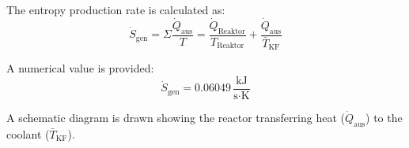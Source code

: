 The entropy production rate is calculated as:  
\[
\dot{S}_{\text{gen}} = \Sigma \frac{\dot{Q}_{\text{aus}}}{T} = \frac{\dot{Q}_{\text{Reaktor}}}{T_{\text{Reaktor}}} + \frac{\dot{Q}_{\text{aus}}}{\bar{T}_{\text{KF}}}
\]  

A numerical value is provided:  
\[
\dot{S}_{\text{gen}} = 0.06049 \, \frac{\text{kJ}}{\text{s·K}}
\]  

A schematic diagram is drawn showing the reactor transferring heat (\( \dot{Q}_{\text{aus}} \)) to the coolant (\( \bar{T}_{\text{KF}} \)).